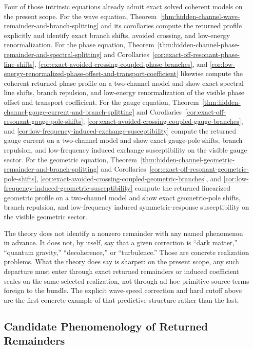 Four of those intrinsic equations already admit exact solved coherent models on
the present scope. For the wave equation,
Theorem~\ref{thm:hidden-channel-wave-remainder-and-branch-splitting} and its
corollaries compute the returned profile explicitly and identify exact branch
shifts, avoided crossing, and low-energy renormalization. For the phase equation,
Theorem~\ref{thm:hidden-channel-phase-remainder-and-spectral-splitting} and
Corollaries~\ref{cor:exact-off-resonant-phase-line-shifts},
\ref{cor:exact-avoided-crossing-coupled-phase-branches}, and
\ref{cor:low-energy-renormalized-phase-offset-and-transport-coefficient}
likewise compute the coherent returned phase profile on a two-channel model
and show exact spectral line shifts, branch repulsion, and low-energy
renormalization of the visible phase offset and transport coefficient. For the
gauge equation, Theorem~\ref{thm:hidden-channel-gauge-current-and-branch-splitting}
and Corollaries~\ref{cor:exact-off-resonant-gauge-pole-shifts},
\ref{cor:exact-avoided-crossing-coupled-gauge-branches}, and
\ref{cor:low-frequency-induced-exchange-susceptibility} compute the returned
gauge current on a two-channel model and show exact gauge-pole shifts, branch
repulsion, and low-frequency induced exchange susceptibility on the visible
gauge sector. For the geometric equation,
Theorem~\ref{thm:hidden-channel-geometric-remainder-and-branch-splitting} and
Corollaries~\ref{cor:exact-off-resonant-geometric-pole-shifts},
\ref{cor:exact-avoided-crossing-coupled-geometric-branches}, and
\ref{cor:low-frequency-induced-geometric-susceptibility} compute the returned
linearized geometric profile on a two-channel model and show exact
geometric-pole shifts, branch repulsion, and low-frequency induced
symmetric-response susceptibility on the visible geometric sector.

The theory does not identify a nonzero remainder with any named phenomenon in
advance. It does not, by itself, say
that a given correction is ``dark matter,'' ``quantum gravity,''
``decoherence,'' or ``turbulence.'' Those are concrete realization problems.
What the theory does say is sharper: on the present scope, any such
departure must enter through exact returned remainders or induced coefficient
scales on the same selected realization, not through ad hoc primitive source
terms foreign to the bundle. The explicit wave-speed correction and hard cutoff
above are the first concrete example of that predictive structure rather than the
last.

\subsection{Candidate Phenomenology of Returned Remainders}


